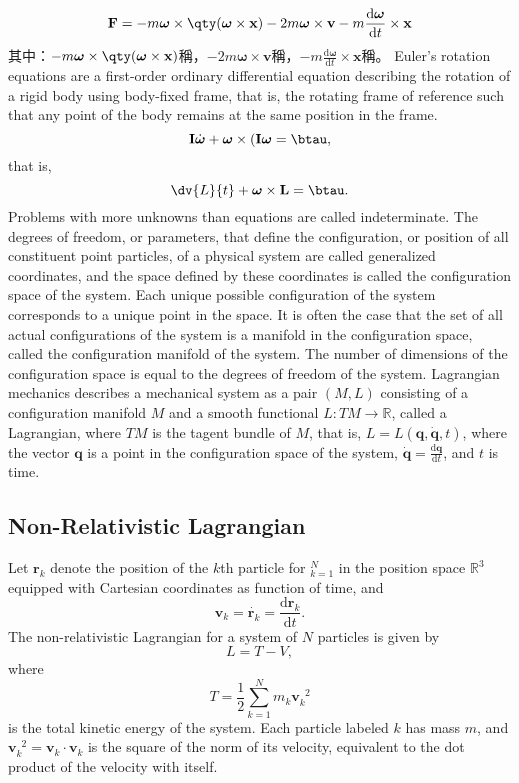 \documentclass[a4paper,12pt]{article}
\begin{document}
\[\mathbf{F}=-m\boldsymbol{\omega}\times\qty(\boldsymbol{\omega}\times\mathbf{x})-2m\boldsymbol{\omega}\times\mathbf{v}-m\frac{\mathrm{d}\boldsymbol{\omega}}{\mathrm{d}t}\times\mathbf{x}\]
其中：$-m\boldsymbol{\omega}\times\qty(\boldsymbol{\omega}\times\mathbf{x})$稱，$-2m\boldsymbol{\omega}\times\mathbf{v}$稱，$-m\frac{\mathrm{d}\boldsymbol{\omega}}{\mathrm{d}t}\times\mathbf{x}$稱。
Euler's rotation equations are a first-order ordinary differential equation describing the rotation of a rigid body using body-fixed frame, that is, the rotating frame of reference such that any point of the body remains at the same position in the frame.
\[\mathbf{I}\dot{\boldsymbol{\omega}}+\boldsymbol{\omega}\times(\mathbf{I}\boldsymbol{\omega}=\btau,\]
that is,
\[\dv{L}{t}+\boldsymbol{\omega}\times\mathbf{L}=\btau.\]
Problems with more unknowns than equations are called indeterminate.
The degrees of freedom, or parameters, that define the configuration, or position of all constituent point particles, of a physical system are called generalized coordinates, and the space defined by these coordinates is called the configuration space of the system. Each unique possible configuration of the system corresponds to a unique point in the space. It is often the case that the set of all actual configurations of the system is a manifold in the configuration space, called the configuration manifold of the system. The number of dimensions of the configuration space is equal to the degrees of freedom of the system.
Lagrangian mechanics describes a mechanical system as a pair $(M,L)$ consisting of a configuration manifold $M$ and a smooth functional $L\colon TM\to\mathbb{R}$, called a Lagrangian, where $TM$ is the tagent bundle of $M$, that is, $L=L(\mathbf{q},\dot{\mathbf{q}},t)$, where the vector $\mathbf{q}$ is a point in the configuration space of the system, $\dot{\mathbf{q}}=\frac{\mathrm{d}\mathbf{q}}{\mathrm{d}t}$, and $t$ is time.
\subsection{Non-Relativistic Lagrangian}
Let $\mathbf{r}_k$ denote the position of the $k$th particle for $_{k=1}^N$ in the position space $\mathbb{R}^3$ equipped with Cartesian coordinates as function of time, and \[\mathbf{v}_k=\dot{\mathbf{r}_k}=\frac{\mathrm{d}\mathbf{r}_k}{\mathrm{d}t}.\]
The non-relativistic Lagrangian for a system of $N$ particles is given by
\[L=T-V,\]
where
\[T=\frac{1}{2}\sum_{k=1}^Nm_k\mathbf{v}_k^{\phantom{k}2}\]
is the total kinetic energy of the system. Each particle labeled $k$ has mass $m$, and $\mathbf{v}_k^{\phantom{k}2}=\mathbf{v}_k\cdot\mathbf{v}_k$ is the square of the norm of its velocity, equivalent to the dot product of the velocity with itself.
\end{document}
